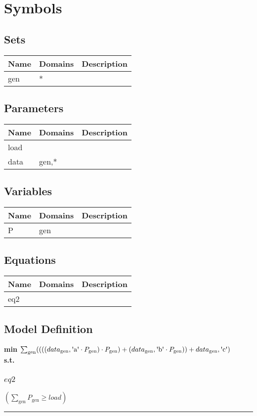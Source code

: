 \documentclass[11pt]{article}
\begin{document}
\section*{Symbols}


\subsection*{Sets}
\begin{tabularx}{\textwidth}{| l | l | X |}
\hline
\textbf{Name} & \textbf{Domains} & \textbf{Description}\\
\hline
\endhead

gen & * & \\
\hline
\end{tabularx}
\subsection*{Parameters}
\begin{tabularx}{\textwidth}{| l | l | X |}
\hline
\textbf{Name} & \textbf{Domains} & \textbf{Description}\\
\hline
\endhead

load &  & \\
data & gen,* & \\
\hline
\end{tabularx}
\subsection*{Variables}
\begin{tabularx}{\textwidth}{| l | l | X |}
\hline
\textbf{Name} & \textbf{Domains} & \textbf{Description}\\
\hline
\endhead

P & gen & \\
\hline
\end{tabularx}
\subsection*{Equations}
\begin{tabularx}{\textwidth}{| l | l | X |}
\hline
\textbf{Name} & \textbf{Domains} & \textbf{Description}\\
\hline
\endhead

eq2 &  & \\
\hline
\end{tabularx}
\subsection*{Model Definition}
\textbf{min} $\sum_\text{gen} ((((data_\text{gen},\text{\textquotesingle a\textquotesingle} \cdot P_\text{gen}) \cdot P_\text{gen}) + (data_\text{gen},\text{\textquotesingle b\textquotesingle} \cdot P_\text{gen})) + data_\text{gen},\text{\textquotesingle c\textquotesingle})$\\
\textbf{s.t.}
\subsubsection*{$eq2$}
$
(\sum_\text{gen} P_\text{gen} \geq load)
$
\vspace{5pt}
\hrule
\bigskip
\end{document}
